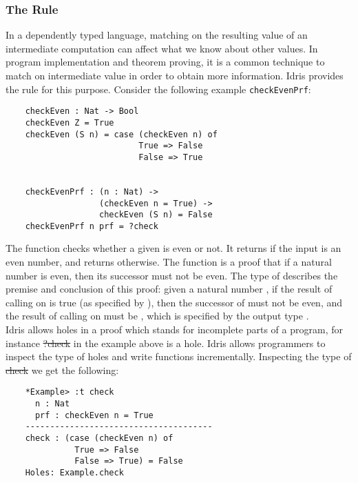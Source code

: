 \subsubsection*{The \textbf{} Rule}
In a dependently typed language, matching on the resulting value of an intermediate computation can affect what we know about other values. In program implementation and theorem proving, it is a common technique to match on intermediate value in order to obtain more information. Idris provides the  rule for this purpose. Consider the following example \texttt{checkEvenPrf}: 
\begin{lstlisting}
    checkEven : Nat -> Bool
    checkEven Z = True
    checkEven (S n) = case (checkEven n) of 
                           True => False
                           False => True


    checkEvenPrf : (n : Nat) -> 
                   (checkEven n = True) -> 
                   checkEven (S n) = False
    checkEvenPrf n prf = ?check
\end{lstlisting}

The  function checks whether a given  is even or not. It returns  if the input  is an even number, and returns  otherwise. The  function is a proof that if a natural number is even, then its successor must not be even. The type of  describes the premise and conclusion of this proof: given a natural number , if the result of calling  on  is true (as specified by ), then the successor of  must not be even, and the result of calling  on  must be , which is specified by the output type . 
\\


Idris allows holes in a proof which stands for incomplete parts of a program, for instance \st{?check} in the example above is a hole. Idris allows programmers to inspect the type of holes and write functions incrementally. Inspecting the type of \st{check} we get the following:
\begin{lstlisting}
    *Example> :t check
      n : Nat
      prf : checkEven n = True
    --------------------------------------
    check : (case (checkEven n) of   
              True => False 
              False => True) = False
    Holes: Example.check
\end{lstlisting}

